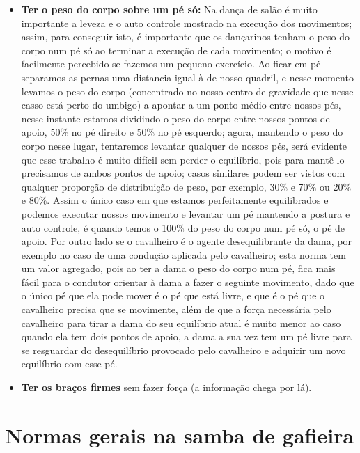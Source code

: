 \begin{itemize}
\item \textbf{Ter o peso do corpo sobre um pé só:} 
Na dança de salão é muito importante a leveza e o auto controle mostrado na 
execução dos movimentos; assim, para conseguir isto, é importante que os dançarinos
tenham o peso do corpo num pé só ao terminar a execução de cada movimento; o motivo
é facilmente percebido se fazemos um pequeno exercício. Ao ficar em pé separamos as
pernas uma distancia igual à de nosso quadril, e nesse momento levamos o peso do corpo
(concentrado no nosso centro de gravidade que nesse casso está perto do umbigo) a
apontar a um ponto médio entre nossos pés, nesse instante estamos dividindo o peso do corpo
entre nossos pontos de apoio, 50$\%$ no pé direito e 50$\%$ no pé esquerdo; agora, mantendo o peso
do corpo nesse lugar, tentaremos levantar qualquer de nossos pés, será evidente
que esse trabalho é muito difícil sem perder o equilíbrio, pois para mantê-lo
precisamos de ambos pontos de apoio; casos similares podem ser vistos com qualquer proporção de distribuição de peso,
por exemplo, 30$\%$ e 70$\%$ ou 20$\%$ e 80$\%$. Assim o único caso em que estamos
perfeitamente equilibrados e podemos executar nossos movimento e levantar um pé 
mantendo a postura e auto controle, é quando
temos o 100$\%$ do peso do corpo num pé só, o pé de apoio. 
Por outro lado se o cavalheiro é  o agente desequilibrante da dama, por exemplo no caso
de uma condução aplicada pelo cavalheiro;
esta norma tem um valor agregado, pois ao ter a dama o peso do corpo num pé, 
fica mais fácil para o condutor orientar
à dama a fazer o seguinte movimento, dado que o único pé que ela pode mover é o pé
que está livre, e que é o pé que o cavalheiro precisa que se movimente, 
além de que a força necessária pelo cavalheiro para tirar a dama do seu equilíbrio 
atual é muito menor ao caso quando ela tem dois pontos de apoio, a dama 
a sua vez tem um pé livre para se resguardar do desequilíbrio provocado pelo 
cavalheiro e adquirir um novo equilíbrio com esse pé.

\item \textbf{Ter os braços firmes}  sem fazer força (a informação chega por lá).
\end{itemize}

\section{Normas gerais na samba de gafieira}


